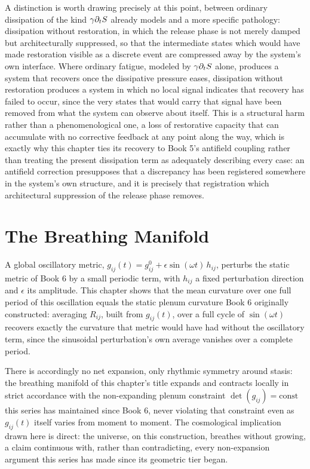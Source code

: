A distinction is worth drawing precisely at this point, between ordinary dissipation of the kind $\gamma \partial_t S$ already models and a more specific pathology: dissipation without restoration, in which the release phase is not merely damped but architecturally suppressed, so that the intermediate states which would have made restoration visible as a discrete event are compressed away by the system's own interface. Where ordinary fatigue, modeled by $\gamma \partial_t S$ alone, produces a system that recovers once the dissipative pressure eases, dissipation without restoration produces a system in which no local signal indicates that recovery has failed to occur, since the very states that would carry that signal have been removed from what the system can observe about itself. This is a structural harm rather than a phenomenological one, a loss of restorative capacity that can accumulate with no corrective feedback at any point along the way, which is exactly why this chapter ties its recovery to Book 5's antifield coupling rather than treating the present dissipation term as adequately describing every case: an antifield correction presupposes that a discrepancy has been registered somewhere in the system's own structure, and it is precisely that registration which architectural suppression of the release phase removes.

\chapter{The Breathing Manifold}

A global oscillatory metric, $g_{ij}(t) = g_{ij}^0 + \epsilon \sin(\omega t)\, h_{ij}$, perturbs the static metric of Book 6 by a small periodic term, with $h_{ij}$ a fixed perturbation direction and $\epsilon$ its amplitude. This chapter shows that the mean curvature over one full period of this oscillation equals the static plenum curvature Book 6 originally constructed: averaging $R_{ij}$, built from $g_{ij}(t)$, over a full cycle of $\sin(\omega t)$ recovers exactly the curvature that metric would have had without the oscillatory term, since the sinusoidal perturbation's own average vanishes over a complete period.

There is accordingly no net expansion, only rhythmic symmetry around stasis: the breathing manifold of this chapter's title expands and contracts locally in strict accordance with the non-expanding plenum constraint $\det(g_{ij}) = \text{const}$ this series has maintained since Book 6, never violating that constraint even as $g_{ij}(t)$ itself varies from moment to moment. The cosmological implication drawn here is direct: the universe, on this construction, breathes without growing, a claim continuous with, rather than contradicting, every non-expansion argument this series has made since its geometric tier began.

